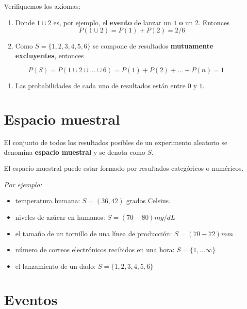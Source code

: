 \documentclass[
]{book}
\providecommand{\tightlist}{%
  \setlength{\itemsep}{0pt}\setlength{\parskip}{0pt}}
\begin{document}
Verifiquemos los axiomas:

\begin{enumerate}
\def\labelenumi{\arabic{enumi})}
\item
  Donde \(1 \cup 2\) es, por ejemplo, el \textbf{evento} de lanzar un \(1\) \textbf{o} un \(2\). Entonces \[P(1 \cup 2)=P(1)+P(2)=2/6\]
\item
  Como \(S=\{1,2,3,4,5,6\}\) se compone de resultados \textbf{mutuamente excluyentes}, entonces
\end{enumerate}

\[P(S)=P(1\cup 2\cup ... \cup 6) = P(1)+P(2)+ ...+P(n)=1\]

\begin{enumerate}
\def\labelenumi{\arabic{enumi})}
\setcounter{enumi}{2}
\tightlist
\item
  Las probabilidades de cada uno de resultados están entre \(0\) y \(1\).
\end{enumerate}

\hypertarget{espacio-muestral}{%
\section{Espacio muestral}\label{espacio-muestral}}

El conjunto de todos los resultados posibles de un experimento aleatorio se denomina \textbf{espacio muestral} y se denota como \(S\).

El espacio muestral puede estar formado por resultados categóricos o numéricos.

\emph{Por ejemplo:}

\begin{itemize}
\tightlist
\item
  temperatura humana: \(S = (36, 42)\) grados Celsius.
\item
  niveles de azúcar en humanos: \(S=(70-80) mg/dL\)
\item
  el tamaño de un tornillo de una línea de producción: \(S=(70-72) mm\)
\item
  número de correos electrónicos recibidos en una hora: \(S =\{1, ...\infty \}\)
\item
  el lanzamiento de un dado: \(S=\{1, 2, 3, 4, 5, 6\}\)
\end{itemize}

\hypertarget{eventos}{%
\section{Eventos}\label{eventos}}
\end{document}
